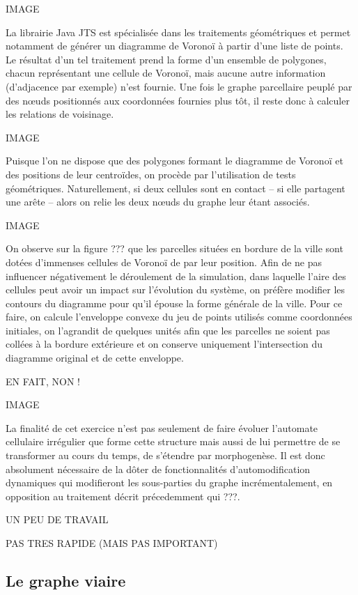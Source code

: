 \documentclass[10pt]{article}
\begin{document}
IMAGE

La librairie Java JTS est spécialisée dans les traitements
géométriques et permet notamment de générer un diagramme de Voronoï à
partir d'une liste de points. Le résultat d'un tel traitement prend la
forme d'un ensemble de polygones, chacun représentant une cellule de
Voronoï, mais aucune autre information (d'adjacence par exemple) n'est
fournie. Une fois le graphe parcellaire peuplé par des n\oe uds
positionnés aux coordonnées fournies plus tôt, il reste donc à
calculer les relations de voisinage.

IMAGE

Puisque l'on ne dispose que des polygones formant le diagramme de
Voronoï et des positions de leur centroïdes, on procède par
l'utilisation de tests géométriques. Naturellement, si deux cellules
sont en contact -- si elle partagent une arête -- alors on relie les
deux n\oe uds du graphe leur étant associés.

IMAGE

On observe sur la figure ??? que les parcelles situées en bordure de
la ville sont dotées d'immenses cellules de Voronoï de par leur
position. Afin de ne pas influencer négativement le déroulement de la
simulation, dans laquelle l'aire des cellules peut avoir un impact sur
l'évolution du système, on préfère modifier les contours du diagramme
pour qu'il épouse la forme générale de la ville. Pour ce faire, on
calcule l'enveloppe convexe du jeu de points utilisés comme
coordonnées initiales, on l'agrandit de quelques unités afin que les
parcelles ne soient pas collées à la bordure extérieure et on conserve
uniquement l'intersection du diagramme original et de cette enveloppe.

EN FAIT, NON !

IMAGE

La finalité de cet exercice n'est pas seulement de faire évoluer
l'automate cellulaire irrégulier que forme cette structure mais aussi
de lui permettre de se transformer au cours du temps, de s'étendre par
morphogenèse. Il est donc absolument nécessaire de la dôter de
fonctionnalités d'automodification dynamiques qui modifieront les
sous-parties du graphe incrémentalement, en opposition au traitement
décrit précedemment qui ???.

UN PEU DE TRAVAIL

PAS TRES RAPIDE (MAIS PAS IMPORTANT)

\subsection{Le graphe viaire}
\end{document}

